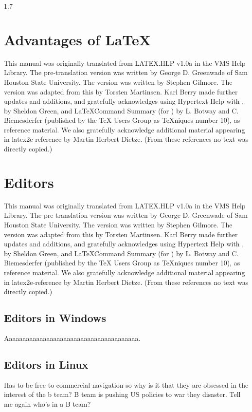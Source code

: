 \documentclass[12pt, a4paper, twocolumn]{article}
\begin{document}
	\begin{spacing}{1.7}
		\section{Advantages of \LaTeX}\label{advantages}
		This manual was originally translated from LATEX.HLP v1.0a in the VMS Help Library.  The pre-translation version was written by George D. Greenwade of Sam Houston State University.  The  version was written by Stephen Gilmore.  The \LaTeXe version was adapted from this by Torsten Martinsen.  Karl Berry made further updates and additions, and gratefully acknowledges using Hypertext Help with \LaTeXe, by Sheldon Green, and \LaTeX Command Summary (for ) by L. Botway and C. Biemesderfer (published by the TeX Users Group as TeXniques number 10), as reference material.  We also gratefully acknowledge additional material appearing in latex2e-reference by Martin Herbert Dietze.  (From these references no text was directly copied.)
	\end{spacing}
	
	\section{Editors} \label{editors}
	This manual was originally translated from LATEX.HLP v1.0a in the VMS Help Library.  The pre-translation version was written by George D. Greenwade of Sam Houston State University.  The  version was written by Stephen Gilmore.  The \LaTeXe version was adapted from this by Torsten Martinsen.  Karl Berry made further updates and additions, and gratefully acknowledges using Hypertext Help with \LaTeXe, by Sheldon Green, and \LaTeX Command Summary (for ) by L. Botway and C. Biemesderfer (published by the TeX Users Group as TeXniques number 10), as reference material.  We also gratefully acknowledge additional material appearing in latex2e-reference by Martin Herbert Dietze.  (From these references no text was directly copied.)
	
	\subsection{Editors in Windows} \label{editor.win} %
	Aaaaaaaaaaaaaaaaaaaaaaaaaaaaaaaaaaaaaaa.
	
	\subsection{Editors in Linux} \label{editor.linux} 
	Has to be free to commercial navigation so why is it that they are obsessed in the interest of the b team? B team is pushing US policies to war they disaster. Tell me again who's in a B team?
	
\end{document}
